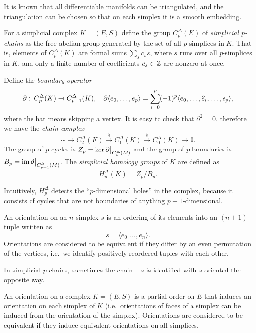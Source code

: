 It is known that all differentiable manifolds can be triangulated, and the triangulation can be chosen so that on each simplex it is a smooth embedding.

\begin{defn}
    For a simplicial complex $K=(E,S)$ define the group $C^\Delta_p(K)$ of \emph{simplicial $p$-chains} as the free abelian group generated by the set of all $p$-simplices in $K$. That is, elements of $C^\Delta_p(K)$ are formal sums $\sum_{s} c_s s$, where $s$ runs over all $p$-simplices in $K$, and only a finite number of coefficients $c_s\in \mathbb{Z}$ are nonzero at once.
    
    Define the \emph{boundary operator}
    \[\partial:\; C^\Delta_p(K)\to C^\Delta_{p-1}(K),\quad \partial\langle e_0,\ldots,e_p\rangle=\sum_{i=0}^p(-1)^p\langle e_0,\ldots,\wh{e}_i,\ldots,e_p\rangle,\]
    where the hat means skipping a vertex. It is easy to check that $\partial^2=0$, therefore we have the \emph{chain complex}
    \[\cdots\to C^\Delta_2(K)\overset\partial\to C^\Delta_1(K)\overset\partial\to C^\Delta_0(K)\to 0.\]
    The group of $p$-cycles is $Z_p=\ker \restr{\partial}{C^\Delta_p(M)}$ and the group of $p$-boundaries is $B_p=\restr{\im\partial}{C^\Delta_{p+1}(M)}$. The \emph{simplicial homology groups} of $K$ are defined as
    \[H^\Delta_p(K)=Z_p/B_p.\]
\end{defn}

Intuitively, $H^\Delta_p$ detects the ``$p$-dimensional holes'' in the complex, because it consists of cycles that are not boundaries of anything $p+1$-dimensional.

\begin{defn}
    An orientation on an $n$-simplex $s$ is an ordering of its elements into an $(n+1)$-tuple written as \[s=\langle e_0,\ldots,e_n\rangle.\]
    Orientations are considered to be equivalent if they differ by an even permutation of the vertices, i.e.\ we identify positively reordered tuples with each other. 
    
    In simplicial $p$-chains, sometimes the chain $-s$ is identified with $s$ oriented the opposite way.
    
    An orientation on a complex $K=(E,S)$ is a partial order on $E$ that induces an orientation on each simplex of $K$ (i.e.\ orientations of faces of a simplex can be induced from the orientation of the simplex). Orientations are considered to be equivalent if they induce equivalent orientations on all simplices.
\end{defn}

